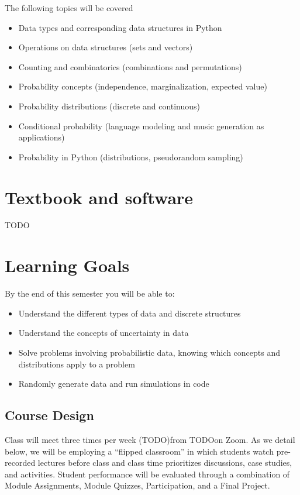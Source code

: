 \documentclass[10pt]{memoir}
\def\mymeetingdays{TODO}
\def\mymeetingtimes{TODO}
\begin{document}
The following topics will be covered

\begin{itemize}
\item Data types and corresponding data structures in Python
\item Operations on data structures (sets and vectors)
\item Counting and combinatorics (combinations and permutations)
\item Probability concepts (independence, marginalization, expected value)
\item Probability distributions (discrete and continuous)
\item Conditional probability (language modeling and music generation as applications)
\item Probability in Python (distributions, pseudorandom sampling)
\end{itemize}

\section{Textbook and software }
TODO

\section{Learning Goals}

By the end of this semester you will be able to:
\begin{itemize}
\item Understand the different types of data and discrete structures
\item Understand the concepts of uncertainty in data
\item Solve problems involving probabilistic data, knowing which concepts and distributions
apply to a problem
\item Randomly generate data and run simulations in code
\end{itemize}

\subsection{Course Design}
Class will meet three times per week (\mymeetingdays)\space from \mymeetingtimes\space on Zoom. As we detail below, we will be employing a ``flipped classroom'' in which students watch pre-recorded lectures before class and class time prioritizes discussions, case studies, and activities. Student performance will be evaluated through a combination of Module Assignments, Module Quizzes, Participation, and a Final Project. 
\end{document}
